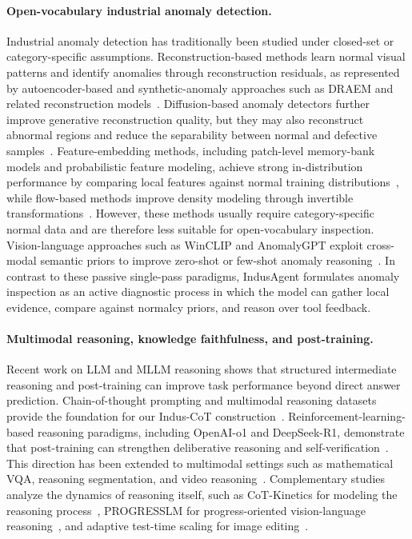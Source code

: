 \documentclass{article}
\begin{document}
{\paragraph{Open-vocabulary industrial anomaly detection.}
Industrial anomaly detection has traditionally been studied under closed-set or category-specific assumptions. Reconstruction-based methods learn normal visual patterns and identify anomalies through reconstruction residuals, as represented by autoencoder-based and synthetic-anomaly approaches such as DRAEM and related reconstruction models~\citep{zavrtanik2021draem, bergmann2018improving}. Diffusion-based anomaly detectors further improve generative reconstruction quality, but they may also reconstruct abnormal regions and reduce the separability between normal and defective samples~\citep{wyatt2022anoddpm, mu2023diffusionad}. Feature-embedding methods, including patch-level memory-bank models and probabilistic feature modeling, achieve strong in-distribution performance by comparing local features against normal training distributions~\citep{roth2022patchcore, defard2021padim}, while flow-based methods improve density modeling through invertible transformations~\citep{yu2021fastflow, rudolph2022csflow}. However, these methods usually require category-specific normal data and are therefore less suitable for open-vocabulary inspection. Vision-language approaches such as WinCLIP and AnomalyGPT exploit cross-modal semantic priors to improve zero-shot or few-shot anomaly reasoning~\citep{jeong2023winclip, gu2024anomalygpt}. In contrast to these passive single-pass paradigms, IndusAgent formulates anomaly inspection as an active diagnostic process in which the model can gather local evidence, compare against normalcy priors, and reason over tool feedback.

\paragraph{Multimodal reasoning, knowledge faithfulness, and post-training.}
Recent work on LLM and MLLM reasoning shows that structured intermediate reasoning and post-training can improve task performance beyond direct answer prediction. Chain-of-thought prompting and multimodal reasoning datasets provide the foundation for our Indus-CoT construction~\citep{wei2022chain, zhang2023multimodal}. Reinforcement-learning-based reasoning paradigms, including OpenAI-o1 and DeepSeek-R1, demonstrate that post-training can strengthen deliberative reasoning and self-verification~\citep{jaech2024openaio1, deepseekr1}. This direction has been extended to multimodal settings such as mathematical VQA, reasoning segmentation, and video reasoning~\citep{peng2025lmmr1, liu2025seg, feng2025videor1}. Complementary studies analyze the dynamics of reasoning itself, such as CoT-Kinetics for modeling the reasoning process~\citep{Bi2025CoTKineticsAT}, PROGRESSLM for progress-oriented vision-language reasoning~\citep{zhang2026progresslm}, and adaptive test-time scaling for image editing~\citep{ADE_CoT}. 

}
\end{document}
